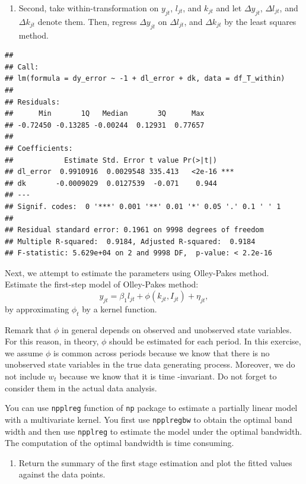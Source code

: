 \documentclass[
]{book}
\providecommand{\tightlist}{%
  \setlength{\itemsep}{0pt}\setlength{\parskip}{0pt}}
\begin{document}
\begin{enumerate}
\def\labelenumi{\arabic{enumi}.}
\setcounter{enumi}{1}
\tightlist
\item
  Second, take within-transformation on \(y_{jt}\), \(l_{jt}\), and \(k_{jt}\) and let \(\Delta y_{jt}\), \(\Delta l_{jt}\), and \(\Delta k_{jt}\) denote them. Then, regress \(\Delta y_{jt}\) on \(\Delta l_{jt}\), and \(\Delta k_{jt}\) by the least squares method.
\end{enumerate}

\begin{verbatim}
## 
## Call:
## lm(formula = dy_error ~ -1 + dl_error + dk, data = df_T_within)
## 
## Residuals:
##      Min       1Q   Median       3Q      Max 
## -0.72450 -0.13285 -0.00244  0.12931  0.77657 
## 
## Coefficients:
##            Estimate Std. Error t value Pr(>|t|)    
## dl_error  0.9910916  0.0029548 335.413   <2e-16 ***
## dk       -0.0009029  0.0127539  -0.071    0.944    
## ---
## Signif. codes:  0 '***' 0.001 '**' 0.01 '*' 0.05 '.' 0.1 ' ' 1
## 
## Residual standard error: 0.1961 on 9998 degrees of freedom
## Multiple R-squared:  0.9184, Adjusted R-squared:  0.9184 
## F-statistic: 5.629e+04 on 2 and 9998 DF,  p-value: < 2.2e-16
\end{verbatim}

Next, we attempt to estimate the parameters using Olley-Pakes method. Estimate the first-step model of Olley-Pakes method:
\[
y_{jt} = \beta_1 l_{jt} + \phi(k_{jt}, I_{jt}) + \eta_{jt},
\]
by approximating \(\phi_t\) by a kernel function.

Remark that \(\phi\) in general depends on observed and unobserved state variables. For this reason, in theory, \(\phi\) should be estimated for each period. In this exercise, we assume \(\phi\) is common across periods because we know that there is no unobserved state variables in the true data generating process. Moreover, we do not include \(w_t\) because we know that it is time -invariant. Do not forget to consider them in the actual data analysis.

You can use \texttt{npplreg} function of \texttt{np} package to estimate a partially linear model with a multivariate kernel. You first use \texttt{npplregbw} to obtain the optimal band width and then use \texttt{npplreg} to estimate the model under the optimal bandwidth. The computation of the optimal bandwidth is time consuming.

\begin{enumerate}
\def\labelenumi{\arabic{enumi}.}
\setcounter{enumi}{2}
\tightlist
\item
  Return the summary of the first stage estimation and plot the fitted values against the data points.
\end{enumerate}
\end{document}
